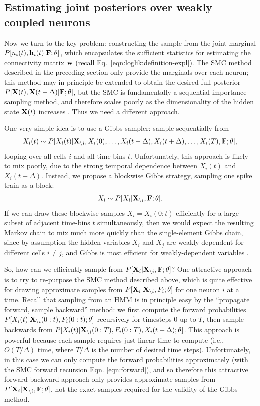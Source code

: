 \subsection{Estimating joint posteriors over weakly coupled neurons}
\label{sec:methods:joint}

Now we turn to the key problem: constructing the sample from the joint marginal $P[n_i(t), \mathbf{h}_i(t) | {\bf F};\mathbf{\theta}]$, which encapsulates the sufficient statistics for estimating the connectivity matrix $\mathbf{w}$ (recall Eq.~\eqref{eqn:loglik:definition-expl}). The SMC method described in the preceding section only provide the marginals over each neuron; this method may in principle be extended to obtain the desired full posterior $P[{\bf X}(t), {\bf X}(t-\Delta) | {\bf F}; \mathbf{\theta}]$, but the SMC is fundamentally a sequential importance sampling method, and therefore scales poorly as the dimensionality of the hidden state ${\bf X}(t)$ increases \cite{BickelBengtsson08}. Thus we need a different approach.

One very simple idea is to use a Gibbs sampler: sample sequentially
from
\begin{align}
X_i(t) \sim P[X_i(t) | \bX_{\i}, X_i(0), \ldots, X_i(t-\Delta),
 X_i(t+\Delta), \ldots, X_i(T), \bF; \bth],
\end{align}
looping over all cells $i$ and all time bins $t$.  Unfortunately, this
approach is likely to mix poorly, due to the strong temporal
dependence between $X_i(t)$ and $X_i(t+\Delta)$.  Instead, we propose
a blockwise Gibbs strategy, sampling one spike train as a block:
\begin{align}
	X_i \sim P[X_i | \bX_{\i}, \bF; \bth].
\end{align}
If we can draw these blockwise samples $X_i = X_i(0:t)$ efficiently for a large subset of adjacent time-bins $t$ simultaneously, then we would expect the resulting Markov chain to mix much more quickly than the single-element Gibbs chain, since by assumption the hidden variables $X_i$ and $X_j$ are weakly dependent for different cells $i \neq j$, and Gibbs is most efficient for weakly-dependent variables \cite{RC05}.

So, how can we efficiently sample from $P[{\bf X}_i | {\bf X}_{\backslash i}, {\bf F}; \mathbf{\theta}]$? One attractive approach is to try to re-purpose the SMC method described above, which is quite effective for drawing approximate samples from $P[{\bf X}_i | {\bf X}_{\backslash i}, F_i; \mathbf{\theta}]$ for one neuron $i$ at a time. Recall that sampling from an HMM is in principle easy by the ``propagate forward, sample backward'' method: we first compute the forward probabilities $P[X_i(t) | {\bf X}_{\backslash i}(0:t), F_i(0:t); \mathbf{\theta}]$ recursively for timesteps $0$ up to $T$, then sample backwards from $P[X_i(t) | {\bf X}_{\backslash i}(0:T), F_i(0:T), X_i(t+\Delta); \mathbf{\theta}]$. This approach is powerful because each sample requires just linear time to compute (i.e., $O(T/\Delta)$ time, where $T/\Delta$ is the number of desired time steps). Unfortunately, in this case we can only compute the forward probabilities approximately (with the SMC forward recursion Eqn. \eqref{eqn:forward}), and so therefore this attractive forward-backward approach only provides approximate samples from $P[{\bf X}_i | {\bf X}_{\backslash i}, {\bf F}; \mathbf{\theta}]$, not the exact samples required for the validity of the Gibbs method.

